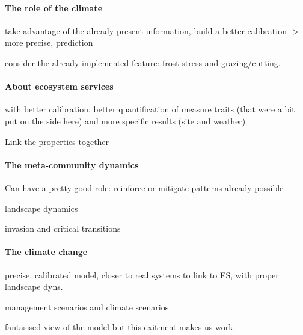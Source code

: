 \paragraph{The role of the climate}

take advantage of the already present information,
build a better calibration -> more precise, prediction

consider the already implemented feature: frost stress and grazing/cutting.

\paragraph{About ecosystem services}

with better calibration, better quantification of measure traits (that were a bit put on the side here) and more specific results (site and weather)

Link the properties together

\paragraph{The meta-community dynamics}

Can have a pretty good role: reinforce or mitigate patterns 
already possible

landscape dynamics

invasion and critical transitions

\paragraph{The climate change}

precise, calibrated model, closer to real systems to link to ES, with proper landscape dyns.

management scenarios and climate scenarios

fantasised view of the model but this exitment makes us work.

